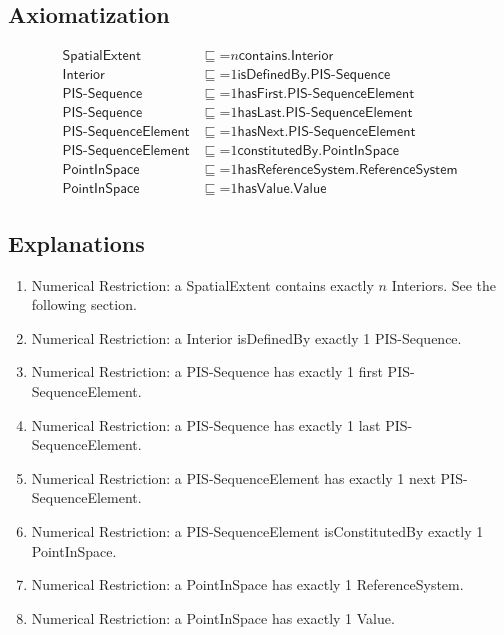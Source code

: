 \subsection{Axiomatization}
\label{axs:Spatial}
\begin{align}
\textsf{SpatialExtent} &\sqsubseteq \mathord{=}n \textsf{contains.Interior} \\
\textsf{Interior} &\sqsubseteq \mathord{=}1 \textsf{isDefinedBy.PIS-Sequence} \\
\textsf{PIS-Sequence} &\sqsubseteq \mathord{=}1 \textsf{hasFirst.PIS-SequenceElement} \\
\textsf{PIS-Sequence} &\sqsubseteq \mathord{=}1 \textsf{hasLast.PIS-SequenceElement} \\
\textsf{PIS-SequenceElement} &\sqsubseteq \mathord{=}1 \textsf{hasNext.PIS-SequenceElement} \\
\textsf{PIS-SequenceElement} &\sqsubseteq \mathord{=}1 \textsf{constitutedBy.PointInSpace} \\
\textsf{PointInSpace} &\sqsubseteq \mathord{=}1 \textsf{hasReferenceSystem.ReferenceSystem} \\
\textsf{PointInSpace} &\sqsubseteq \mathord{=}1 \textsf{hasValue.Value}
\end{align}

\subsection{Explanations}
\label{exp:Spatial}
\begin{enumerate}
\item Numerical Restriction: a \textsf{SpatialExtent} \textsf{contains} exactly $n$ \textsf{Interiors}. See the following section.
\item Numerical Restriction: a \textsf{Interior} \textsf{isDefinedBy} exactly 1 \textsf{PIS-Sequence}.
\item Numerical Restriction: a \textsf{PIS-Sequence} has exactly 1 first \textsf{PIS-SequenceElement}.
\item Numerical Restriction: a \textsf{PIS-Sequence} has exactly 1 last \textsf{PIS-SequenceElement}.
\item Numerical Restriction: a \textsf{PIS-SequenceElement} has exactly 1 next \textsf{PIS-SequenceElement}.
\item Numerical Restriction: a \textsf{PIS-SequenceElement} \textsf{isConstitutedBy} exactly 1 \textsf{PointInSpace}.
\item Numerical Restriction: a \textsf{PointInSpace} has exactly 1 \textsf{ReferenceSystem}.
\item Numerical Restriction: a \textsf{PointInSpace} has exactly 1 \textsf{Value}. 
\end{enumerate}

